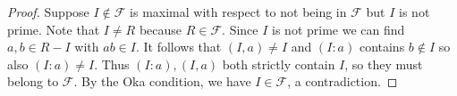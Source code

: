\documentclass[10pt,a4paper]{amsart}
\theoremstyle{plain}
\theoremstyle{definition}
\theoremstyle{remark}
\numberwithin{equation}{subsection}
\begin{document}
\begin{proof}
Suppose $I \not \in \mathcal{F}$ is maximal with respect to not being in
$\mathcal{F}$ but $I$ is not prime. Note that $I \not = R$ because
$R \in \mathcal{F}$. Since $I$ is not prime we can find $a, b \in R - I$
with $ab \in I$. It follows that $(I, a) \neq I$ and $(I : a)$ contains
$b \not \in I$ so also $(I : a) \neq I$. Thus $(I : a), (I, a)$ both
strictly contain $I$, so they must belong to $\mathcal{F}$.
By the Oka condition, we have $I \in \mathcal{F}$, a contradiction.
\end{proof}
\end{document}
